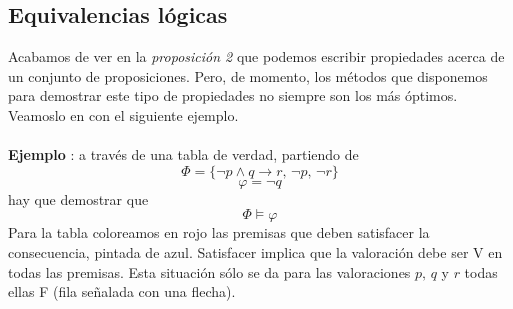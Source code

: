 \subsection{Equivalencias lógicas}
Acabamos de ver en la \textit{proposición 2} que podemos escribir propiedades acerca de un conjunto de proposiciones. Pero, de momento, los métodos que disponemos para demostrar este tipo de propiedades no siempre son los más óptimos. Veamoslo en con el siguiente ejemplo.
\paragraph{}
\addtocounter{ej}{1} %
\textbf{Ejemplo }: a través de una tabla de verdad, partiendo de 
\[ \Phi=\{ \neg p \wedge q \rightarrow r,\, \neg p,\, \neg r \} \]
\[ \varphi= \neg q\]
hay que demostrar que 
\[ \Phi \models \varphi \]
Para la tabla coloreamos en rojo las premisas que deben satisfacer la consecuencia, pintada de azul. Satisfacer implica que la valoración debe ser V en todas las premisas. Esta situación sólo se da para las valoraciones $p, \, q$ y $r$ todas ellas F (fila señalada con una flecha). 

